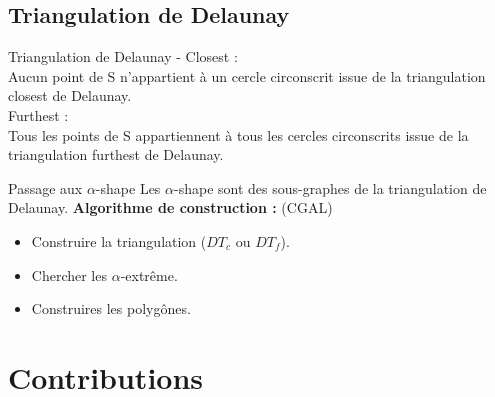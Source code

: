 \documentclass{beamer}
\begin{document}
\subsection{Triangulation de Delaunay}  
\begin{frame}
  \begin{block}{Triangulation de Delaunay - \cite{EdeKirSei83}}
    \alert{Closest :} \\
    \hspace{0.5cm}Aucun point de S n'appartient à un cercle circonscrit issue de la triangulation closest de Delaunay.\\
    \alert{Furthest :} \\
    \hspace{0.5cm}Tous les points de S appartiennent à tous les cercles circonscrits issue de la triangulation furthest de Delaunay.
      
  \end{block}

  \begin{exampleblock}{Passage aux $\alpha$-shape}
    Les $\alpha$-shape sont des sous-graphes de la triangulation de Delaunay.
    \textbf{Algorithme de construction :} (CGAL)
    \begin{itemize}
      \item Construire la triangulation ($DT_c$ ou $DT_f$).
      \item Chercher les $\alpha$-extrême.
      \item Construires les polygônes.
    \end{itemize}
  \end{exampleblock}
 


\end{frame}

\section{Contributions}
\end{document}
